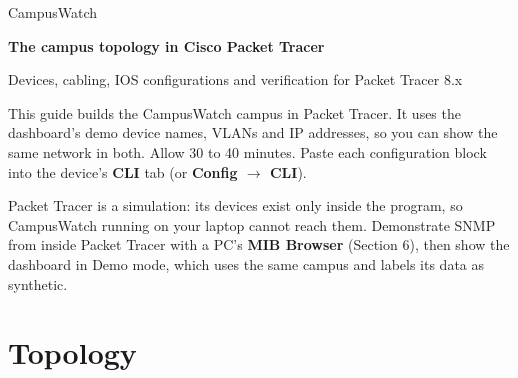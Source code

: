 \documentclass[11pt,a4paper]{article}
\begin{document}
\begin{center}
{\sffamily\color{accent}\large CampusWatch\par}
\vspace{2pt}
{\sffamily\bfseries\LARGE\color{ink} The campus topology in Cisco Packet Tracer\par}
\vspace{6pt}
{\color{muted} Devices, cabling, IOS configurations and verification for Packet Tracer 8.x\par}
\end{center}

This guide builds the CampusWatch campus in Packet Tracer. It uses the dashboard's demo device names, VLANs and IP addresses,
so you can show the same network in both. Allow 30 to 40 minutes. Paste each configuration block into the device's
\textbf{CLI} tab (or \textbf{Config $\rightarrow$ CLI}).

\begin{note}
Packet Tracer is a simulation: its devices exist only inside the program, so CampusWatch running on your laptop cannot reach
them. Demonstrate SNMP from inside Packet Tracer with a PC's \textbf{MIB Browser} (Section 6), then show the dashboard in Demo
mode, which uses the same campus and labels its data as synthetic.
\end{note}

\section{Topology}
\end{document}
